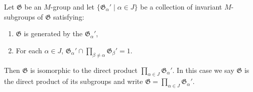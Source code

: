 Let $\mathfrak{G}$ be an $M$-group and let $\{\mathfrak{G}_{\alpha}' \mid \alpha \in J\}$ be a collection of invariant $M$-subgroups of $\mathfrak{G}$ satisfying:

\begin{enumerate}
\item $\mathfrak{G}$ is generated by the $\mathfrak{G}_{\alpha}'$,
\item For each $\alpha \in J$, $\mathfrak{G}_{\alpha}' \cap \prod_{\beta \neq \alpha} \mathfrak{G}_{\beta}' = 1$.
\end{enumerate}

Then $\mathfrak{G}$ is isomorphic to the direct product $\prod_{\alpha \in J} \mathfrak{G}_{\alpha}'$. In this case we say $\mathfrak{G}$ is the direct product of its subgroups and write $\mathfrak{G} = \prod_{\alpha \in J} \mathfrak{G}_{\alpha}'$.
